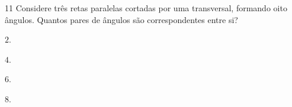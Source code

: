 

\num{11} Considere três retas paralelas cortadas por uma transversal,
formando oito ângulos. Quantos pares de ângulos são correspondentes
entre si?

\begin{escolha}
\item $2$.
\item $4$.
\item $6$.
\item $8$.
\end{escolha}



